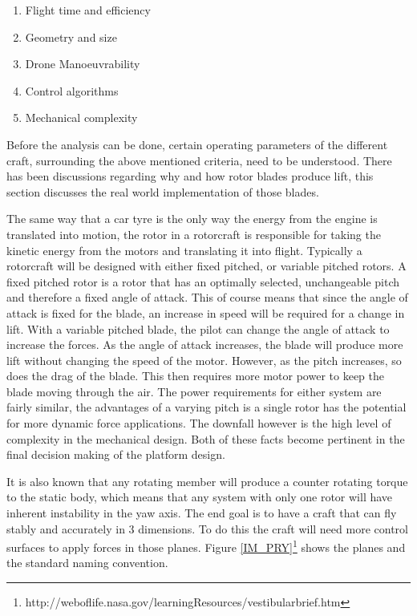 \begin{enumerate}
	\item Flight time and efficiency
	\item Geometry and size
	\item Drone Manoeuvrability
	\item Control algorithms
	\item Mechanical complexity
\end{enumerate}

Before the analysis can be done, certain operating parameters of the different craft, surrounding the above mentioned criteria, need to be understood. There has been discussions regarding why and how rotor blades produce lift, this section discusses the real world implementation of those blades.


The same way that a car tyre is the only way the energy from the engine is translated into motion, the rotor in a rotorcraft is responsible for taking the kinetic energy from the motors and translating it into flight. Typically a rotorcraft will be designed with either fixed pitched, or variable pitched rotors. A fixed pitched rotor is a rotor that has an optimally selected, unchangeable pitch and therefore a fixed angle of attack. This of course means that since the angle of attack is fixed for the blade, an increase in speed will be required for a change in lift. With a variable pitched blade, the pilot can change the angle of attack to increase the forces. As the angle of attack increases, the blade will produce more lift without changing the speed of the motor. However, as the pitch increases, so does the drag of the blade. This then requires more motor power to keep the blade moving through the air.
The power requirements for either system are fairly similar, the advantages of a varying pitch is a single rotor has the potential for more dynamic force applications. The downfall however is the high level of complexity in the mechanical design. Both of these facts become pertinent in the final decision making of the platform design.

It is also known that any rotating member will produce a counter rotating torque to the static body, which means that any system with only one rotor will have inherent instability in the yaw axis. The end goal is to have a craft that can fly stably and accurately in 3 dimensions. To do this the craft will need more control surfaces to apply forces in those planes. Figure \ref{IM_PRY}\footnote{http://weboflife.nasa.gov/learningResources/vestibularbrief.htm} shows the planes and the standard naming convention. 

